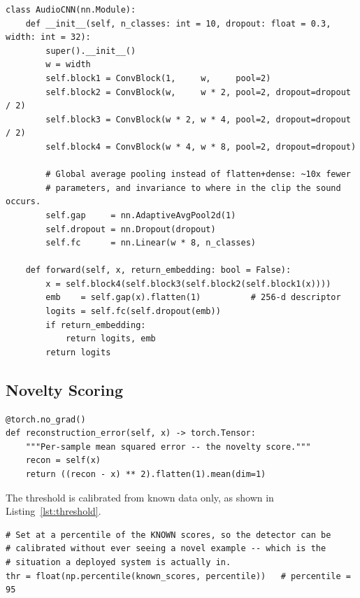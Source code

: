 \documentclass[11pt, a4paper]{article}
\begin{document}
\begin{lstlisting}[caption={AudioCNN forward pass with optional embedding output (\texttt{src/models.py}).}, label={lst:cnn}]
class AudioCNN(nn.Module):
    def __init__(self, n_classes: int = 10, dropout: float = 0.3, width: int = 32):
        super().__init__()
        w = width
        self.block1 = ConvBlock(1,     w,     pool=2)
        self.block2 = ConvBlock(w,     w * 2, pool=2, dropout=dropout / 2)
        self.block3 = ConvBlock(w * 2, w * 4, pool=2, dropout=dropout / 2)
        self.block4 = ConvBlock(w * 4, w * 8, pool=2, dropout=dropout)

        # Global average pooling instead of flatten+dense: ~10x fewer
        # parameters, and invariance to where in the clip the sound occurs.
        self.gap     = nn.AdaptiveAvgPool2d(1)
        self.dropout = nn.Dropout(dropout)
        self.fc      = nn.Linear(w * 8, n_classes)

    def forward(self, x, return_embedding: bool = False):
        x = self.block4(self.block3(self.block2(self.block1(x))))
        emb    = self.gap(x).flatten(1)          # 256-d descriptor
        logits = self.fc(self.dropout(emb))
        if return_embedding:
            return logits, emb
        return logits
\end{lstlisting}

\subsection{Novelty Scoring}

\begin{lstlisting}[caption={Reconstruction error as a novelty score (\texttt{src/models.py}).}, label={lst:ae}]
@torch.no_grad()
def reconstruction_error(self, x) -> torch.Tensor:
    """Per-sample mean squared error -- the novelty score."""
    recon = self(x)
    return ((recon - x) ** 2).flatten(1).mean(dim=1)
\end{lstlisting}

The threshold is calibrated from known data only, as shown in Listing~\ref{lst:threshold}.

\begin{lstlisting}[caption={Threshold calibration without novel examples (\texttt{src/anomaly.py}).}, label={lst:threshold}]
# Set at a percentile of the KNOWN scores, so the detector can be
# calibrated without ever seeing a novel example -- which is the
# situation a deployed system is actually in.
thr = float(np.percentile(known_scores, percentile))   # percentile = 95
\end{lstlisting}
\end{document}
